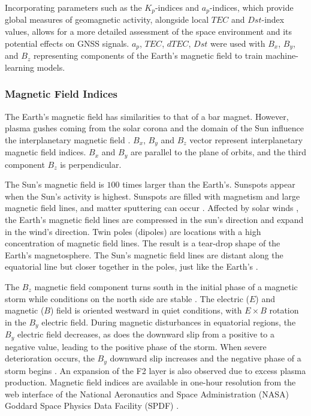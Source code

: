 \documentclass[sn-mathphys-num]{sn-jnl}%
\begin{document}
Incorporating parameters such as the $K_{p}$-indices and $a_{p}$-indices, which provide global measures of geomagnetic activity, alongside local $TEC$ and $Dst$-index values, allows for a more detailed assessment of the space environment and its potential effects on GNSS signals. $a_{p}$, $TEC$, $dTEC$, $Dst$ were used with $B_x$, $B_y$, and $B_z$ representing components of the Earth's magnetic field to train machine-learning models.

\subsubsection{Magnetic Field Indices}

The Earth's magnetic field has similarities to that of a bar magnet. However, plasma gushes \cite{schwenn2001solar} coming from the solar corona and the domain of the Sun influence the interplanetary magnetic field \cite{melnikov1990relationships}. $B_{x}$, $B_{y}$ and $B_{z}$ vector represent interplanetary magnetic field indices. $B_{x}$ and $B_{y}$ are parallel to the plane of orbits, and the third component $B_{z}$ is perpendicular. 

The Sun's magnetic field is $100$ times larger than the Earth's. Sunspots \cite{harden2005solar} appear when the Sun's activity is highest. Sunspots are filled with magnetism and large magnetic field lines, and matter sputtering can occur \cite{gonzalez1994geomagnetic}. Affected by solar winds \cite{Viereck2024}, the Earth's magnetic field lines are compressed in the sun's direction and expand in the wind's direction. Twin poles (dipoles) are locations with a high concentration of magnetic field lines. The result is a tear-drop shape of the Earth's magnetosphere. The Sun's magnetic field lines are distant along the equatorial line but closer together in the poles, just like the Earth's \cite{aschwanden2006physics}.

The $B_{z}$ magnetic field component turns south in the initial phase of a magnetic storm while conditions on the north side are stable \cite{abraha2014total}. The electric ($E$) and magnetic ($B$) field is oriented westward in quiet conditions, with $E \times B$ rotation in the $B_{y}$ electric field. During magnetic disturbances in equatorial regions, the $B_{y}$ electric field decreases, as does the downward slip from a positive to a negative value, leading to the positive phase of the storm. When severe deterioration occurs, the $B_{y}$ downward slip increases and the negative phase of a storm begins \cite{turunen1980examples, adeniyi1986magnetic}. An expansion of the F2 layer is also observed due to excess plasma production. Magnetic field indices are available in one-hour resolution from the web interface of the National Aeronautics and Space Administration (NASA) Goddard Space Physics Data Facility (SPDF) \cite{Papitashvili2024About, Papitashvili2024Explorer}.
 
\end{document}
